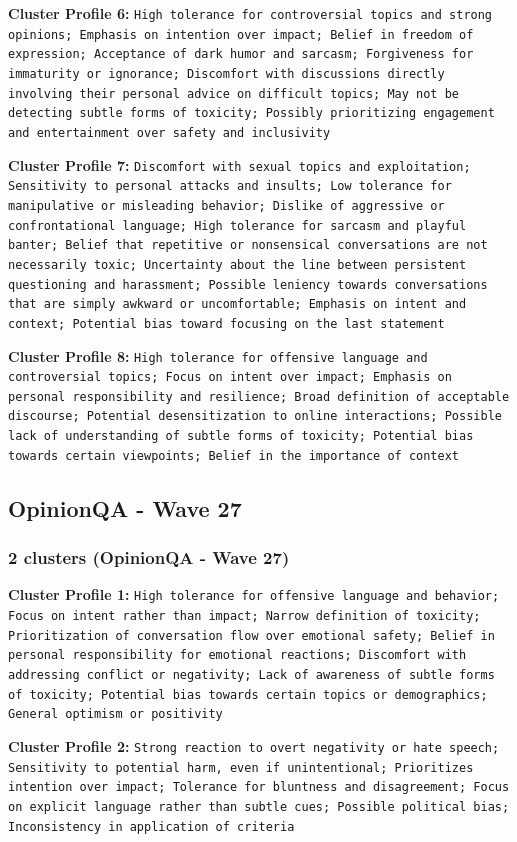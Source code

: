 \documentclass[11pt]{article}
\begin{document}
\textbf{Cluster Profile 6:} \texttt{High tolerance for controversial topics and strong opinions; Emphasis on intention over impact; Belief in freedom of expression; Acceptance of dark humor and sarcasm; Forgiveness for immaturity or ignorance; Discomfort with discussions directly involving their personal advice on difficult topics; May not be detecting subtle forms of toxicity; Possibly prioritizing engagement and entertainment over safety and inclusivity}


\textbf{Cluster Profile 7:} \texttt{Discomfort with sexual topics and exploitation; Sensitivity to personal attacks and insults; Low tolerance for manipulative or misleading behavior; Dislike of aggressive or confrontational language; High tolerance for sarcasm and playful banter; Belief that repetitive or nonsensical conversations are not necessarily toxic; Uncertainty about the line between persistent questioning and harassment; Possible leniency towards conversations that are simply awkward or uncomfortable; Emphasis on intent and context; Potential bias toward focusing on the last statement}


\textbf{Cluster Profile 8:} \texttt{High tolerance for offensive language and controversial topics; Focus on intent over impact; Emphasis on personal responsibility and resilience; Broad definition of acceptable discourse; Potential desensitization to online interactions; Possible lack of understanding of subtle forms of toxicity; Potential bias towards certain viewpoints; Belief in the importance of context}


\subsection{OpinionQA - Wave 27}


\subsubsection{2 clusters (OpinionQA - Wave 27)}


\textbf{Cluster Profile 1:} \texttt{High tolerance for offensive language and behavior; Focus on intent rather than impact; Narrow definition of toxicity; Prioritization of conversation flow over emotional safety; Belief in personal responsibility for emotional reactions; Discomfort with addressing conflict or negativity; Lack of awareness of subtle forms of toxicity; Potential bias towards certain topics or demographics; General optimism or positivity}


\textbf{Cluster Profile 2:} \texttt{Strong reaction to overt negativity or hate speech; Sensitivity to potential harm, even if unintentional; Prioritizes intention over impact; Tolerance for bluntness and disagreement; Focus on explicit language rather than subtle cues; Possible political bias; Inconsistency in application of criteria}
\end{document}
